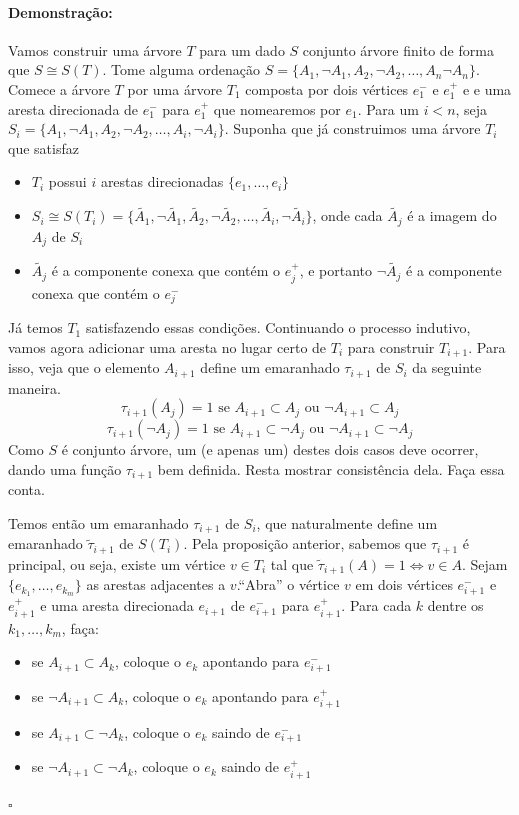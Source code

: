 \documentclass[11pt]{article}
\newcommand{\pulinho}{\vspace{.5cm}}
\theoremstyle{definition}
\theoremstyle{definition}
\theoremstyle{definition}
\theoremstyle{definition}
\theoremstyle{definition}
\theoremstyle{definition}
\theoremstyle{definition}
\theoremstyle{definition}
\theoremstyle{definition}
\theoremstyle{definition}
\theoremstyle{definition}
\theoremstyle{definition}
\newenvironment{prova}{\paragraph{Demonstração:}}{\hfill$\square$ 
\pulinho
}
\theoremstyle{definition}
\begin{document}
\begin{prova}
Vamos construir uma árvore $T$ para um dado $S$ conjunto árvore finito de forma que $S \cong S(T)$. Tome alguma ordenação $S = \{A_1,\lnot A_1, A_2, \lnot A_2, \dots, A_n \lnot A_n\}$. Comece a árvore $T$ por uma árvore $T_1$ composta por dois vértices $e_1^-$ e $e_1^+$ e e uma aresta direcionada de $e_1^-$ para $e_1^+$ que nomearemos por $e_1$. Para um $i < n$, seja $S_i = \{A_1,\lnot A_1, A_2, \lnot A_2, \dots, A_i, \lnot A_i\}$. Suponha que já construimos uma árvore $T_i$ que satisfaz

\begin{itemize}[label=]
  \item $T_i$ possui $i$ arestas direcionadas $\{e_1, \dots, e_i\}$
  \item $S_i \cong S(T_i) = \{\tilde{A_1},\lnot \tilde{A_1}, \tilde{A_2}, \lnot \tilde{A_2}, \dots, \tilde{A_i}, \lnot \tilde{A_i}\}$, onde cada $\tilde{A_j}$ é a imagem do $A_j$ de $S_i$
  \item $\tilde{A_j}$ é a componente conexa que contém o $e_j^+$, e portanto $\lnot \tilde{A_j}$ é a componente conexa que contém o $e_j^-$
\end{itemize}  

Já temos $T_1$ satisfazendo essas condições. Continuando o processo indutivo, vamos agora adicionar uma aresta no lugar certo de $T_i$ para construir $T_{i+1}$. Para isso, veja que o elemento $A_{i+1}$ define um emaranhado $\tau_{i+1}$ de $S_i$ da seguinte maneira.
\[ \tau_{i+1}(A_j) = 1 \text{ se } A_{i+1} \subset A_j \text{ ou } \lnot A_{i+1} \subset A_j \]
\[ \tau_{i+1}(\lnot A_j) = 1 \text{ se }  A_{i+1} \subset \lnot A_j \text{ ou } \lnot A_{i+1} \subset \lnot A_{j} \]
Como $S$ é conjunto árvore, um (e apenas um) destes dois casos deve ocorrer, dando uma função $\tau_{i+1}$ bem definida. Resta mostrar consistência dela. Faça essa conta.

Temos então um emaranhado $\tau_{i+1}$ de $S_i$, que naturalmente define um emaranhado $\tilde{\tau}_{i+1}$ de $S(T_i)$. Pela proposição anterior, sabemos que $\tau_{i+1}$ é principal, ou seja, existe um vértice $v \in T_i$ tal que $\tilde{\tau}_{i+1}(A) = 1 \Leftrightarrow v \in A$. Sejam $\{e_{k_1}, \dots, e_{k_m}\}$ as arestas adjacentes a $v$.``Abra'' o vértice $v$ em dois vértices $e_{i+1}^-$ e $e_{i+1}^+$ e uma aresta direcionada $e_{i+1}$ de $e_{i+1}^-$ para $e_{i+1}^+$. Para cada $k$ dentre os $k_1,\dots, k_m$, faça: 

\begin{itemize}[label=]
  \item se $A_{i+1} \subset A_k$, coloque o $e_k$ apontando para $e_{i+1}^-$ 
  \item se $\lnot A_{i+1} \subset A_k$, coloque o $e_k$ apontando para $e_{i+1}^+$ 
  \item se $A_{i+1} \subset \lnot A_k$, coloque o $e_k$ saindo de $e_{i+1}^-$ 
  \item se $\lnot A_{i+1} \subset \lnot A_k$, coloque o $e_k$ saindo de $e_{i+1}^+$ 
\end{itemize}


\end{prova}
\end{document}

